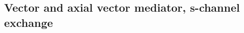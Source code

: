 \newcommand{\bra}[1]{\langle #1|}
\newcommand{\ket}[1]{|#1\rangle}
\newcommand{\MET}{\slashed{E}_T}
\newcommand{\mDM}{m_{\rm{DM}}}
\newcommand{\mMed}{M_{\rm{med}}}
\newcommand{\gDM}{g_{\rm{DM}}}
\newcommand{\gq}{g_q}
\newcommand{\ifb}{\rm{fb}^{-1}}

\subsection{Vector and axial vector mediator, s-channel exchange}
\label{sec:monojet_V}


